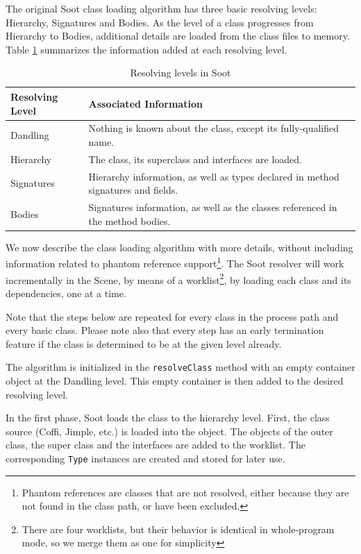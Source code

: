 \documentclass{sigplanconf}
\begin{document}
The original Soot class loading algorithm has three basic resolving levels: Hierarchy, Signatures and Bodies. As the level of a class progresses from Hierarchy to Bodies, additional details are loaded from the class files to memory. Table \ref{tbl:resolving_levels} summarizes the information added at each resolving level. 

\begin{table}
\begin{tabularx}{\columnwidth}{|l|X|}
\hline
\textbf{Resolving Level} & \textbf{Associated Information} \\\hline
Dandling  & Nothing is known about the class, except its fully-qualified name.\\\hline
Hierarchy & The class, its superclass and interfaces are loaded. \\\hline
Signatures & Hierarchy information, as well as types declared in method signatures and fields. \\\hline
Bodies & Signatures information, as well as the classes referenced in the method bodies. \\\hline
\end{tabularx}
\caption{Resolving levels in Soot}
\label{tbl:resolving_levels}
\end{table}

We now describe the class loading algorithm with more details, without including information related to phantom reference support\footnote{Phantom references are classes that are not resolved, either because they are not found in the class path, or have been excluded.}.
The Soot resolver will work incrementally in the Scene, by means of a worklist\footnote{There are four worklists, but their behavior is identical in whole-program mode, so we merge them as one for simplicity}, by loading each class and its dependencies, one at a time.

Note that the steps below are repeated for every class in the process path and every basic class. Please note also that every step has an early termination feature if the class is determined to be at the given level already.

The algorithm is initialized in the {\tt resolveClass} method with an empty \sootclass container object at the Dandling level. This empty container is then added to the desired resolving level.

In the first phase, Soot loads the class to the hierarchy level. First, the class source (Coffi, Jimple, etc.) is loaded into the \sootclass object.
The \sootclass objects of the outer class, the super class and the interfaces are added to the worklist. The corresponding {\tt Type} instances are created and stored for later use.
\end{document}
